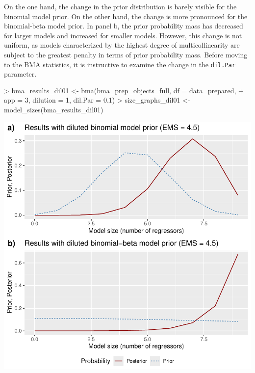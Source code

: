 \documentclass[a4paper]{article}
\begin{document}
On the one hand, the change in the prior distribution is barely visible for the binomial model prior.
On the other hand, the change is more pronounced for the binomial-beta model prior.
In panel b, the prior probability mass has decreased for larger models and increased for smaller models.
However, this change is not uniform, as models characterized by the highest degree of multicollinearity are subject to the greatest penalty in terms of prior probability mass.
Before moving to the BMA statistics, it is instructive to examine the change in the \verb+dil.Par+ parameter.
\begin{Schunk}
\begin{Sinput}
> bma_results_dil01 <- bma(bma_prep_objects_full, df = data_prepared,
+                        app = 3, dilution = 1, dil.Par = 0.1)
> size_graphs_dil01 <- model_sizes(bma_results_dil01)
\end{Sinput}
\end{Schunk}
\includegraphics{bdsm_vignette-041}
\end{document}
